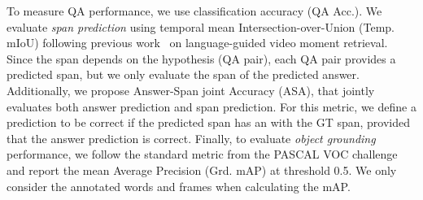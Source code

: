 \documentclass[11pt,a4paper]{article}
\begin{document}
To measure QA performance, we use classification accuracy (QA Acc.). 
We evaluate \textit{span prediction} using temporal mean Intersection-over-Union (Temp. mIoU) following previous work~\cite{Hendricks2017LocalizingMI} on language-guided video moment retrieval. 
Since the span depends on the hypothesis (QA pair), each QA pair provides a predicted span, but we only evaluate the span of the predicted answer.
Additionally, we propose Answer-Span joint Accuracy (ASA), that jointly evaluates both answer prediction and span prediction. 
For this metric, we define a prediction to be correct if the predicted span has an  with the  GT span, provided that the answer prediction is correct. 
Finally, to evaluate \textit{object grounding} performance, we follow the standard metric from the PASCAL VOC challenge~\cite{everingham2015pascal} and report the mean Average Precision (Grd. mAP) at  threshold 0.5. We only consider the annotated words and frames when calculating the mAP.

\begin{table}[!t]
\centering
\small
{}
\caption{TVQA+ test set results.}
\label{tab:main_res}
\end{table}
\end{document}
